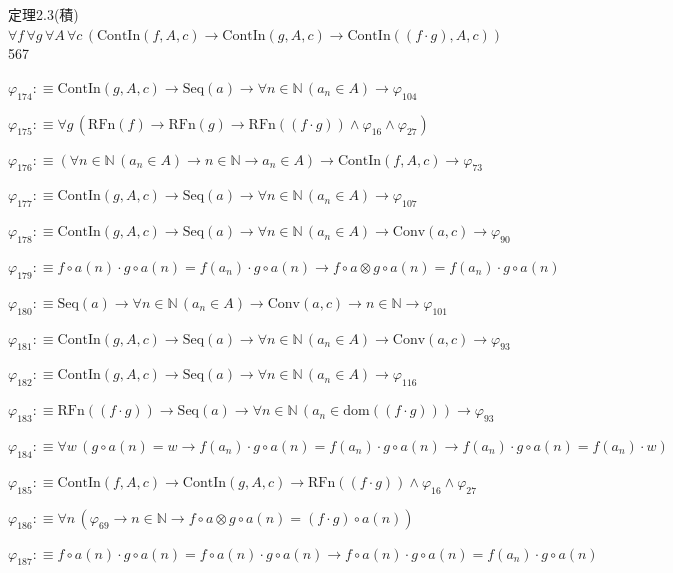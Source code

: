 \begin{fullproof}{定理2.3(積)}{$\forall f\,\forall g\,\forall A\,\forall c\,(\mathrm{ContIn}(f,A,c) \to \mathrm{ContIn}(g,A,c) \to \mathrm{ContIn}((f \cdot g),A,c))$}{567}
\begin{abbrevlist}
\item $\varphi_{174} :\equiv \mathrm{ContIn}(g,A,c) \to \mathrm{Seq}(a) \to \forall n \in \mathbb{N}\,(a_{n} \in A) \to \varphi_{104}$
\item $\varphi_{175} :\equiv \forall g\,(\mathrm{RFn}(f) \to \mathrm{RFn}(g) \to \mathrm{RFn}((f \cdot g)) \land \varphi_{16} \land \varphi_{27})$
\item $\varphi_{176} :\equiv (\forall n \in \mathbb{N}\,(a_{n} \in A) \to n \in \mathbb{N} \to a_{n} \in A) \to \mathrm{ContIn}(f,A,c) \to \varphi_{73}$
\item $\varphi_{177} :\equiv \mathrm{ContIn}(g,A,c) \to \mathrm{Seq}(a) \to \forall n \in \mathbb{N}\,(a_{n} \in A) \to \varphi_{107}$
\item $\varphi_{178} :\equiv \mathrm{ContIn}(g,A,c) \to \mathrm{Seq}(a) \to \forall n \in \mathbb{N}\,(a_{n} \in A) \to \mathrm{Conv}(a,c) \to \varphi_{90}$
\item $\varphi_{179} :\equiv f \circ a(n) \cdot g \circ a(n) = f(a_{n}) \cdot g \circ a(n) \to f \circ a \otimes g \circ a(n) = f(a_{n}) \cdot g \circ a(n)$
\item $\varphi_{180} :\equiv \mathrm{Seq}(a) \to \forall n \in \mathbb{N}\,(a_{n} \in A) \to \mathrm{Conv}(a,c) \to n \in \mathbb{N} \to \varphi_{101}$
\item $\varphi_{181} :\equiv \mathrm{ContIn}(g,A,c) \to \mathrm{Seq}(a) \to \forall n \in \mathbb{N}\,(a_{n} \in A) \to \mathrm{Conv}(a,c) \to \varphi_{93}$
\item $\varphi_{182} :\equiv \mathrm{ContIn}(g,A,c) \to \mathrm{Seq}(a) \to \forall n \in \mathbb{N}\,(a_{n} \in A) \to \varphi_{116}$
\item $\varphi_{183} :\equiv \mathrm{RFn}((f \cdot g)) \to \mathrm{Seq}(a) \to \forall n \in \mathbb{N}\,(a_{n} \in \mathrm{dom}((f \cdot g))) \to \varphi_{93}$
\item $\varphi_{184} :\equiv \forall w\,(g \circ a(n) = w \to f(a_{n}) \cdot g \circ a(n) = f(a_{n}) \cdot g \circ a(n) \to f(a_{n}) \cdot g \circ a(n) = f(a_{n}) \cdot w)$
\item $\varphi_{185} :\equiv \mathrm{ContIn}(f,A,c) \to \mathrm{ContIn}(g,A,c) \to \mathrm{RFn}((f \cdot g)) \land \varphi_{16} \land \varphi_{27}$
\item $\varphi_{186} :\equiv \forall n\,(\varphi_{69} \to n \in \mathbb{N} \to f \circ a \otimes g \circ a(n) = (f \cdot g) \circ a(n))$
\item $\varphi_{187} :\equiv f \circ a(n) \cdot g \circ a(n) = f \circ a(n) \cdot g \circ a(n) \to f \circ a(n) \cdot g \circ a(n) = f(a_{n}) \cdot g \circ a(n)$

\end{abbrevlist}
\end{fullproof}
